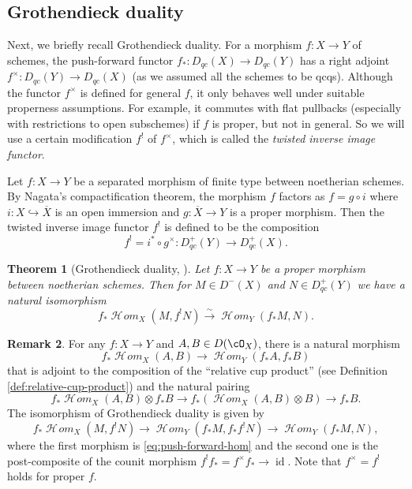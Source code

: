 \documentclass{amsart}
\numberwithin{equation}{section}
\theoremstyle{plain}
\newtheorem{theorem}{Theorem}[section]
\theoremstyle{definition}
\newtheorem{remark}[theorem]{Remark}
\DeclareMathOperator{\CHom}{\mathcal{H}\!\mathit{om}}
\DeclareMathOperator{\id}{\mathrm{id}}
\begin{document}
\subsection{Grothendieck duality}
Next, we briefly recall Grothendieck duality.
For a morphism $f \colon X \to Y$ of schemes,
the push-forward functor $f_* \colon D_{qc}(X) \to D_{qc}(Y)$ has a right adjoint $f^\times \colon D_{qc}(Y) \to D_{qc}(X)$ (as we assumed all the schemes to be qcqs).
Although the functor $f^\times$ is defined for general $f$, it only behaves well under suitable properness assumptions.
For example, it commutes with flat pullbacks (especially with restrictions to open subschemes) if $f$ is proper, but not in general.
So we will use a certain modification $f^!$ of $f^\times$, which is called the \emph{twisted inverse image functor}.

Let $f \colon X \to Y$ be a separated morphism of finite type between noetherian schemes.
By Nagata's compactification theorem, the morphism $f$ factors as $f = g \circ i$ where $i \colon X \hookrightarrow \overline{X}$ is an open immersion and $g \colon \overline{X} \to Y$ is a proper morphism.
Then
the twisted inverse image functor $f^!$ is defined to be the composition
\begin{equation}
    f^! = i^* \circ g^\times \colon D_{qc}^+(Y) \to D_{qc}^+(X).
\end{equation}

\begin{theorem}[Grothendieck duality, {\cite[\href{https://stacks.math.columbia.edu/tag/0AU3}{Tag 0AU3}]{stacks-project}}]\label{grothendieck_duality}
    Let $f \colon X \to Y$ be a proper morphism between noetherian schemes.
    Then for $M \in D^-(X)$ and $N \in D_{qc}^+(Y)$ we have a natural isomorphism
    \begin{equation}\label{eq:grothendieck_duality}
        f_*\CHom_X(M, f^!N) \xrightarrow{\sim} \CHom_Y(f_*M, N).
    \end{equation}

\end{theorem}
\begin{remark}\label{remark:grothendieck-duality-isomorphism}
    For any $f \colon X \to Y$ and $A, B \in D(\cO_X)$, there is a natural morphism
    \begin{equation}\label{eq:push-forward-hom}
        f_*\CHom_X(A, B) \to \CHom_Y(f_*A, f_*B)
    \end{equation}
    that is adjoint to the composition of the ``relative cup product'' (see Definition \ref{def:relative-cup-product}) and the natural pairing
    \begin{equation}
        f_*\CHom_X(A, B) \otimes f_*B \to f_*(\CHom_X(A, B) \otimes B) \to f_*B.
    \end{equation}
    The isomorphism of Grothendieck duality is given by
    \begin{equation}
        f_*\CHom_X(M, f^!N) \to \CHom_Y(f_*M, f_*f^!N) \to \CHom_Y(f_*M, N),
    \end{equation}
    where the first morphism is \eqref{eq:push-forward-hom} and the second one is the post-composite of the counit morphism $f^!f_*=f^\times f_* \to \id$.
    Note that $f^\times = f^!$ holds for proper $f$.
\end{remark}
\end{document}
